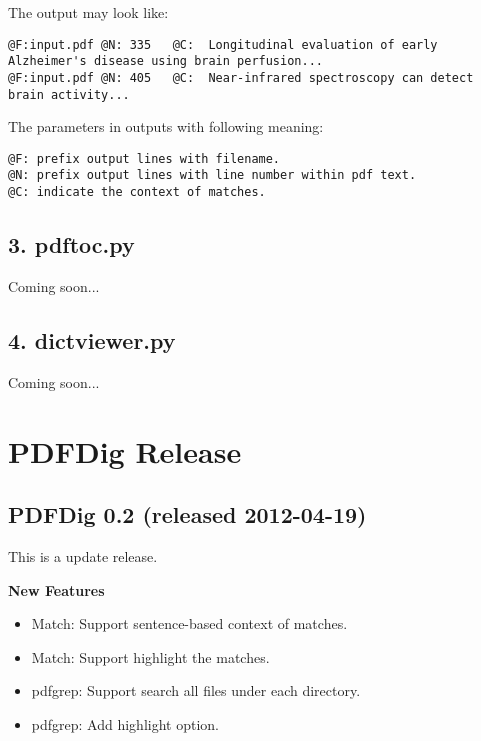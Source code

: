 \documentclass[letterpaper,10pt,oneside]{sphinxmanual}
\begin{document}
The output may look like:

\begin{Verbatim}[commandchars=\\\{\}]
@F:input.pdf @N: 335   @C:  Longitudinal evaluation of early Alzheimer's disease using brain perfusion...
@F:input.pdf @N: 405   @C:  Near-infrared spectroscopy can detect brain activity...
\end{Verbatim}

The parameters in outputs with following meaning:

\begin{Verbatim}[commandchars=\\\{\}]
@F: prefix output lines with filename.
@N: prefix output lines with line number within pdf text.
@C: indicate the context of matches.
\end{Verbatim}


\section{3. pdftoc.py}
\label{utility:pdftoc-py}
Coming soon...


\section{4. dictviewer.py}
\label{utility:dictviewer-py}
Coming soon...


\chapter{PDFDig Release}
\label{release:pdfdig-release}\label{release::doc}

\section{PDFDig 0.2 (released 2012-04-19)}
\label{release:pdfdig-0-2-released-2012-04-19}
This is a update release.

\textbf{New Features}
\begin{itemize}
\item {} 
Match: Support sentence-based context of matches.

\item {} 
Match: Support highlight the matches.

\item {} 
pdfgrep: Support search all files under each directory.

\item {} 
pdfgrep: Add highlight option.

\end{itemize}
\end{document}
